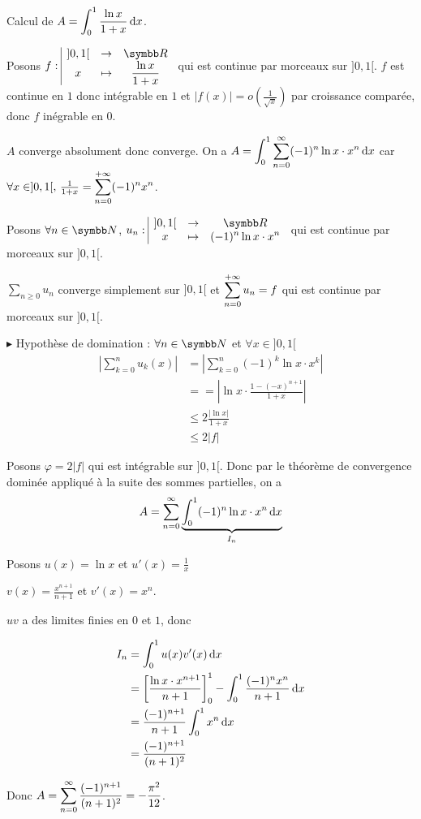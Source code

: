 \begin{exemple}
    Calcul de $A = \displaystyle \int_0^1 \frac{\ln x}{1 + x} \,\mathrm{d}x$.

    Posons $\fonction f{]0, 1[}{\R}{x}{\frac{\ln x}{1 + x}}$ 
    qui est continue par morceaux sur $]0, 1[$. $f$ est continue en $1$ donc intégrable en $1$
    et $|f(x)| = o\left(\frac 1 {\sqrt x} \right)$ par croissance comparée, donc $f$ inégrable en $0$. 

    $A$ converge absolument donc converge. On a $\displaystyle A = \int_{0}^{1 } \sum_{n = 0}^{\infty} (-1)^n \ln x \cdot x^n \,\mathrm{d}x$
    car $\forall x \in ]0, 1[, \, \frac 1 {1 + x} = \displaystyle \sum_{n = 0}^{+ \infty} (-1)^n x^n$.

    Posons $\forall n \in \N$, $\fonction {u_n}{]0, 1[}{\R}{x}{(-1)^n \ln x \cdot x^n}$ qui est continue par morceaux sur $]0, 1[$.

    $\sum_{n \geqslant 0} u_n$ converge simplement sur $]0, 1[$ et $\displaystyle \sum_{n = 0}^{+ \infty} u_n = f$ qui est continue par morceaux sur $]0, 1[$.

    \avspace $\blacktriangleright$ Hypothèse de domination : $\forall n \in \N$ et $\forall 
    x \in ]0, 1[$\begin{align}
        \left| \sum_{k = 0 }^{n } u_k(x) \right| & = \left| \sum_{k = 0}^{n } (-1)^k \ln x \cdot x^k \right| \\
        & == \left| \ln x \cdot \frac{1 - (-x)^{n + 1}}{1 + x} \right| \\
        & \leqslant 2 \frac{|\ln x|}{1+x} \\
        & \leqslant 2 |f|
    \end{align}

    Posons $\varphi = 2 |f|$ qui est intégrable sur $]0, 1[$. Donc par le théorème de convergence dominée 
    appliqué à la suite des sommes partielles, on a 
    $$A = \sum_{n=0}^{\infty} \underbrace{\int_{0}^{1} (-1)^n \ln x \cdot x^n \,\mathrm{d}x}_{I_n}$$

    Posons $u(x) = \ln x$ et $u'(x) = \frac 1 x$ 

    $v(x) = \frac{x^{n + 1}}{n + 1}$ et $v'(x) = x^n$.

    $uv$ a des limites finies en $0$ et $1$, donc 
    
    \begin{align}
    I_n & = \int_0^1 u(x) v'(x) \,\mathrm{d}x \\
    & = \left[ \frac{\ln x \cdot x^{n+1}}{n + 1} \right]_0^1 - \int_0^1 \frac{(-1)^nx^n}{n+1} \,\mathrm{d}x \\
    & = \frac{(-1)^{n+1}}{n + 1} \int_0^1 x^n \,\mathrm{d}x \\
    & = \frac{(-1)^{n+1}}{(n + 1)^2}
    \end{align}

    Donc $A = \displaystyle \sum_{n = 0 }^{\infty} \frac{(-1)^{n+1}}{(n + 1)^2} = - \frac{\pi^2}{12}$.

\end{exemple}

